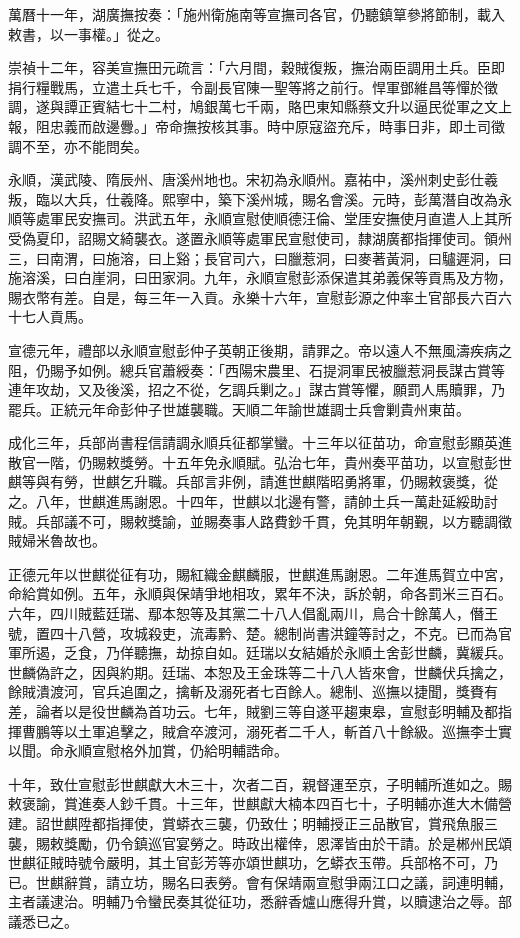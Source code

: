 \begin{pinyinscope}
萬曆十一年，湖廣撫按奏：「施州衛施南等宣撫司各官，仍聽鎮筸參將節制，載入敕書，以一事權。」從之。

崇禎十二年，容美宣撫田元疏言：「六月間，穀賊復叛，撫治兩臣調用土兵。臣即捐行糧戰馬，立遣土兵七千，令副長官陳一聖等將之前行。悍軍鄧維昌等憚於徵調，遂與譚正賓結七十二村，鳩銀萬七千兩，賂巴東知縣蔡文升以逼民從軍之文上報，阻忠義而啟邊釁。」帝命撫按核其事。時中原寇盜充斥，時事日非，即土司徵調不至，亦不能問矣。

永順，漢武陵、隋辰州、唐溪州地也。宋初為永順州。嘉祐中，溪州刺史彭仕羲叛，臨以大兵，仕羲降。熙寧中，築下溪州城，賜名會溪。元時，彭萬潛自改為永順等處軍民安撫司。洪武五年，永順宣慰使順德汪倫、堂厓安撫使月直遣人上其所受偽夏印，詔賜文綺襲衣。遂置永順等處軍民宣慰使司，隸湖廣都指揮使司。領州三，曰南渭，曰施溶，曰上谿；長官司六，曰臘惹洞，曰麥著黃洞，曰驢遲洞，曰施溶溪，曰白崖洞，曰田家洞。九年，永順宣慰彭添保遣其弟義保等貢馬及方物，賜衣幣有差。自是，每三年一入貢。永樂十六年，宣慰彭源之仲率土官部長六百六十七人貢馬。

宣德元年，禮部以永順宣慰彭仲子英朝正後期，請罪之。帝以遠人不無風濤疾病之阻，仍賜予如例。總兵官蕭綬奏：「西陽宋農里、石提洞軍民被臘惹洞長謀古賞等連年攻劫，又及後溪，招之不從，乞調兵剿之。」謀古賞等懼，願罰人馬贖罪，乃罷兵。正統元年命彭仲子世雄襲職。天順二年諭世雄調士兵會剿貴州東苗。

成化三年，兵部尚書程信請調永順兵征都掌蠻。十三年以征苗功，命宣慰彭顯英進散官一階，仍賜敕獎勞。十五年免永順賦。弘治七年，貴州奏平苗功，以宣慰彭世麒等與有勞，世麒乞升職。兵部言非例，請進世麒階昭勇將軍，仍賜敕褒獎，從之。八年，世麒進馬謝恩。十四年，世麒以北邊有警，請帥土兵一萬赴延綏助討賊。兵部議不可，賜敕獎諭，並賜奏事人路費鈔千貫，免其明年朝覲，以方聽調徵賊婦米魯故也。

正德元年以世麒從征有功，賜紅織金麒麟服，世麒進馬謝恩。二年進馬賀立中宮，命給賞如例。五年，永順與保靖爭地相攻，累年不決，訴於朝，命各罰米三百石。六年，四川賊藍廷瑞、鄢本恕等及其黨二十八人倡亂兩川，鳥合十餘萬人，僭王號，置四十八營，攻城殺吏，流毒黔、楚。總制尚書洪鐘等討之，不克。已而為官軍所遏，乏食，乃佯聽撫，劫掠自如。廷瑞以女結婚於永順土舍彭世麟，冀緩兵。世麟偽許之，因與約期。廷瑞、本恕及王金珠等二十八人皆來會，世麟伏兵擒之，餘賊潰渡河，官兵追圍之，擒斬及溺死者七百餘人。總制、巡撫以捷聞，獎賚有差，論者以是役世麟為首功云。七年，賊劉三等自遂平趨東皋，宣慰彭明輔及都指揮曹鵬等以土軍追擊之，賊倉卒渡河，溺死者二千人，斬首八十餘級。巡撫李士實以聞。命永順宣慰格外加賞，仍給明輔誥命。

十年，致仕宣慰彭世麒獻大木三十，次者二百，親督運至京，子明輔所進如之。賜敕褒諭，賞進奏人鈔千貫。十三年，世麒獻大楠本四百七十，子明輔亦進大木備營建。詔世麒陞都指揮使，賞蟒衣三襲，仍致仕；明輔授正三品散官，賞飛魚服三襲，賜敕獎勵，仍令鎮巡官宴勞之。時政出權倖，恩澤皆由於干請。於是郴州民頌世麒征賊時號令嚴明，其土官彭芳等亦頌世麒功，乞蟒衣玉帶。兵部格不可，乃已。世麒辭賞，請立坊，賜名曰表勞。會有保靖兩宣慰爭兩江口之議，詞連明輔，主者議逮治。明輔乃令蠻民奏其從征功，悉辭香爐山應得升賞，以贖逮治之辱。部議悉已之。


\end{pinyinscope}
